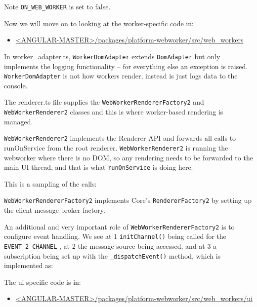 Note
\texttt{ON\_WEB\_WORKER}
is set to false.

Now we will move on to looking at the worker-specific code in:

\begin{itemize}
  \item \href{https://github.com/angular/angular/tree/master/packages/platform-webworker/src/web_workers}
        {<ANGULAR-MASTER>/packages/platform-webworker/src/web\_workers}
\end{itemize}

In worker\_adapter.ts,
\texttt{WorkerDomAdapter}
extends
\texttt{DomAdapter}
but only implements
the logging functionality – for everything else an exception is raised.
\texttt{WorkerDomAdapter}
is not how workers render, instead is just logs data to the console.



The renderer.ts file supplies the
\texttt{WebWorkerRendererFactory2}
and
\texttt{WebWorkerRenderer2}
classes and this is where worker-based rendering is managed.

\texttt{WebWorkerRenderer2}
implements the Renderer API and forwards all calls to
runOnService from the root renderer.
\texttt{WebWorkerRenderer2}
is running the webworker
where there is no DOM, so any rendering needs to be forwarded to the main UI
thread, and that is what
\texttt{runOnService}
is doing here.

This is a sampling of the calls:



\texttt{WebWorkerRendererFactory2}
implements Core’s
\texttt{RendererFactory2}
by setting up the
client message broker factory.



An additional and very important role of
\texttt{WebWorkerRendererFactory2}
is to configure
event handling. We see at
1
\texttt{initChannel()}
being called for the
\texttt{EVENT\_2\_CHANNEL}
, at
2
the message source being accessed, and at
3
a subscription being set up with the
\texttt{\_dispatchEvent()}
method, which is implemented as:



The ui specific code is in:

\begin{itemize}
  \item \href{https://github.com/angular/angular/tree/master/packages/platform-webworker/src/web_workers/ui}
        {<ANGULAR-MASTER>/packages/platform-webworker/src/web\_workers/ui}
\end{itemize}

